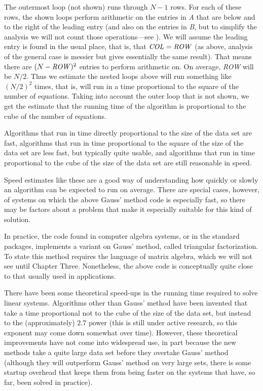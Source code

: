 The outermost loop (not shown) runs through $N-1$ rows.
For each of these rows, 
the shown loops perform arithmetic on the entries
in \textit{A} that are below and to the right of the leading entry
(and also on the entries in \textit{B}, but to simplify the
analysis we will not count those operations---see \nearbyexercise{}).
We will assume the leading entry is found in the usual place, that is, that 
$\text{\textit{COL}}=\text{\textit{ROW}}$
(as above, analysis of the general case is messier but gives essentially
the same result).
That means there are $(N-\text{\textit{ROW}})^2$ entries to perform
arithmetic on.
On average, \textit{ROW} will be $N/2$.
Thus we estimate the nested loops above will run 
something like $(N/2)^2$ times,
that is, will run in a time proportional to the square of the number
of equations.
Taking into account the outer loop that is not shown, we get
the estimate that the running time of the algorithm
is proportional to the cube of the number of equations.

Algorithms that run in time directly proportional to the size of the 
data set are fast, algorithms that run in time proportional to the
square of the size of the data set are less fast, but typically quite
usable, and algorithms that run in time proportional to the cube of
the size of the data set are still reasonable in speed. 

Speed estimates like these are a good way of understanding how quickly or
slowly an algorithm can be expected to run on average.
There are special cases, however, of systems on which the above 
Gauss' method code is especially fast, so there may be factors
about a problem that make it especially suitable for this kind of solution.

In practice, the code found in computer algebra systems, or in the
standard packages, implements a variant on Gauss' method, called 
triangular factorization.
To state this method requires the language of matrix algebra, which we will not
see until Chapter Three.
Nonetheless, the above code is conceptually quite close to that usually used
in applications.

There have been some theoretical speed-ups in the running time required
to solve linear systems.
Algorithms other than Gauss' method have been invented
that take a time proportional not to the cube of the size of the
data set, but instead to the (approximately) $2.7$ power
(this is still under active research, so this exponent may
come down somewhat over time).
However, these theoretical improvements have not come into widespread
use,
in part because the new methods take a quite large data set before
they overtake Gauss' method 
(although they will outperform Gauss' method on very large sets, there
is some startup overhead that keeps them from being faster on the
systems that have, so far, been solved in practice).   



